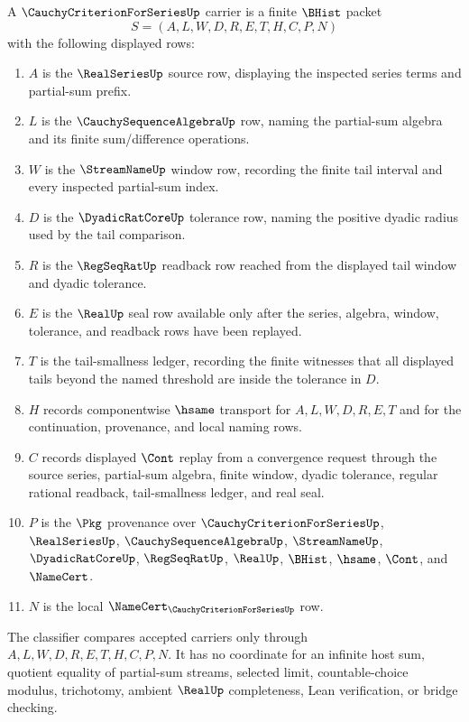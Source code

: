 \begin{definition}
\label{def:cauchy-criterion-for-series-carrier}
A $\CauchyCriterionForSeriesUp$ carrier is a finite $\BHist$ packet
$$
S=(A,L,W,D,R,E,T,H,C,P,N)
$$
with the following displayed rows:
\begin{enumerate}
\item $A$ is the $\RealSeriesUp$ source row, displaying the inspected series terms and partial-sum prefix.
\item $L$ is the $\CauchySequenceAlgebraUp$ row, naming the partial-sum algebra and its finite sum/difference operations.
\item $W$ is the $\StreamNameUp$ window row, recording the finite tail interval and every inspected partial-sum index.
\item $D$ is the $\DyadicRatCoreUp$ tolerance row, naming the positive dyadic radius used by the tail comparison.
\item $R$ is the $\RegSeqRatUp$ readback row reached from the displayed tail window and dyadic tolerance.
\item $E$ is the $\RealUp$ seal row available only after the series, algebra, window, tolerance, and readback rows have been replayed.
\item $T$ is the tail-smallness ledger, recording the finite witnesses that all displayed tails beyond the named threshold are inside the tolerance in $D$.
\item $H$ records componentwise $\hsame$ transport for $A,L,W,D,R,E,T$ and for the continuation, provenance, and local naming rows.
\item $C$ records displayed $\Cont$ replay from a convergence request through the source series, partial-sum algebra, finite window, dyadic tolerance, regular rational readback, tail-smallness ledger, and real seal.
\item $P$ is the $\Pkg$ provenance over $\CauchyCriterionForSeriesUp$, $\RealSeriesUp$, $\CauchySequenceAlgebraUp$, $\StreamNameUp$, $\DyadicRatCoreUp$, $\RegSeqRatUp$, $\RealUp$, $\BHist$, $\hsame$, $\Cont$, and $\NameCert$.
\item $N$ is the local $\NameCert_{\CauchyCriterionForSeriesUp}$ row.
\end{enumerate}
The classifier compares accepted carriers only through $A,L,W,D,R,E,T,H,C,P,N$. It has no coordinate for an infinite host sum, quotient equality of partial-sum streams, selected limit, countable-choice modulus, trichotomy, ambient $\RealUp$ completeness, Lean verification, or bridge checking.
\end{definition}

